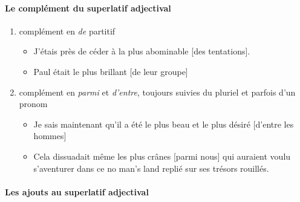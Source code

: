 \documentclass[UTF8]{report}
\begin{document}
\paragraph{Le complément du superlatif adjectival}
\begin{enumerate}
    \item complément en \textit{de} partitif
    \begin{itemize}
        \item J’étais près de céder à la plus abominable [des tentations].
        \item Paul était le plus brillant [de leur groupe]
    \end{itemize}
    \item complément en \textit{parmi} et \textit{d’entre}, toujours suivies du pluriel et parfois d’un pronom
    \begin{itemize}
        \item Je sais maintenant qu’il a été le plus beau et le plus désiré [d’entre les hommes]
        \item Cela dissuadait même les plus crânes [parmi nous] qui auraient voulu s’aventurer dans ce no man’s land replié sur ses trésors rouillés.
    \end{itemize}
\end{enumerate}

\paragraph{Les ajouts au superlatif adjectival}
\end{document}
